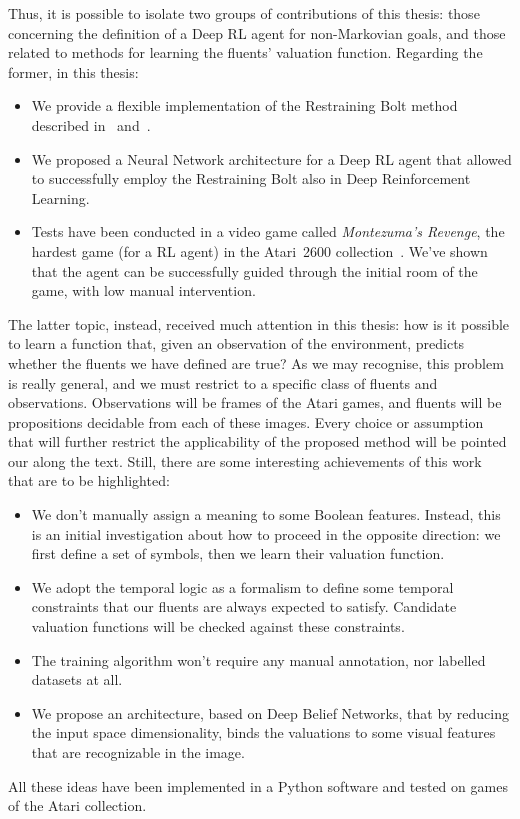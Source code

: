 Thus, it is possible to isolate two groups of contributions of this thesis:
those concerning the definition of a Deep RL agent for non-Markovian goals,
and those related to methods for learning the fluents' valuation function.
Regarding the former, in this thesis:
\begin{itemize}
		\item We provide a flexible implementation of the Restraining Bolt method
			described in~\cite{bib:bolt} and~\cite{bib:degiacomo-logic-nmrdp}.
		\item We proposed a Neural Network architecture for a Deep RL agent that
			allowed to successfully employ the Restraining Bolt also in Deep
			Reinforcement Learning.
		\item Tests have been conducted in a video game called \emph{Montezuma's
			Revenge}, the hardest game (for a RL agent) in the Atari~2600
			collection~\cite{bib:atari-deepq-nature}. We've shown that the agent can
			be successfully guided through the initial room of the game, with low
			manual intervention.
\end{itemize}

The latter topic, instead, received much attention in this thesis: how is it
possible to learn a function that, given an observation of the environment,
predicts whether the fluents we have defined are true? As we may recognise,
this problem is really general, and we must restrict to a specific class of
fluents and observations. Observations will be frames of the Atari games, and
fluents will be propositions decidable from each of these images. Every choice
or assumption that will further restrict the applicability of the proposed
method will be pointed our along the text. Still, there are some interesting
achievements of this work that are to be highlighted:
\begin{itemize}
	\item We don't manually assign a meaning to some Boolean features.
		Instead, this is an initial investigation about how to proceed in the
		opposite direction: we first define a set of symbols, then we learn their
		valuation function.
	\item We adopt the temporal logic \ldl{} as a formalism to define some
		temporal constraints that our fluents are always expected to satisfy.
		Candidate valuation functions will be checked against these constraints.
	\item The training algorithm won't require any manual annotation,
		nor labelled datasets at all.
	\item We propose an architecture, based on Deep Belief Networks, that by
		reducing the input space dimensionality, binds the valuations to some
		visual features that are recognizable in the image.
\end{itemize}
All these ideas have been implemented in a Python software and tested on games
of the Atari collection.

